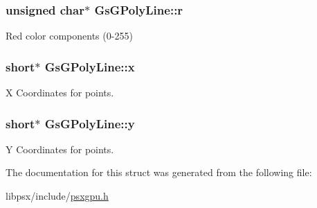 \hypertarget{structGsGPolyLine_ae3def8c38d1ce8654453993918dc5083}{}
\subsubsection[{r}]{\setlength{\rightskip}{0pt plus 5cm}unsigned char$\ast$ Gs\+G\+Poly\+Line\+::r}\label{structGsGPolyLine_ae3def8c38d1ce8654453993918dc5083}


Red color components (0-\/255) 

\hypertarget{structGsGPolyLine_a06f46b93f3b97a8bfc6acee0789d0133}{}
\subsubsection[{x}]{\setlength{\rightskip}{0pt plus 5cm}short$\ast$ Gs\+G\+Poly\+Line\+::x}\label{structGsGPolyLine_a06f46b93f3b97a8bfc6acee0789d0133}


X Coordinates for points. 

\hypertarget{structGsGPolyLine_a8213528a633323574c70651761ea83be}{}
\subsubsection[{y}]{\setlength{\rightskip}{0pt plus 5cm}short$\ast$ Gs\+G\+Poly\+Line\+::y}\label{structGsGPolyLine_a8213528a633323574c70651761ea83be}


Y Coordinates for points. 



The documentation for this struct was generated from the following file\+:\begin{DoxyCompactItemize}
\item 
libpsx/include/\hyperlink{psxgpu_8h}{psxgpu.\+h}\end{DoxyCompactItemize}
